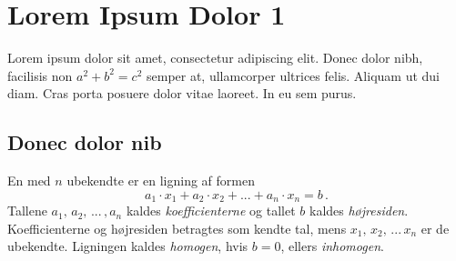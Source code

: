 
\setcounter{chapter}{998} %



\chapter{Lorem Ipsum Dolor 1} \label{tn999}


\begin{basis}
Lorem ipsum dolor sit amet, consectetur adipiscing elit. Donec dolor nibh, facilisis non $a^2 + b^2 = c^2$ semper at, ullamcorper ultrices felis. Aliquam ut dui diam.  Cras porta posuere dolor vitae laoreet. In eu sem purus. 
\end{basis}

\section{Donec dolor nib}
\label{tn999.linlign}

En  med $n$ ubekendte er en ligning af formen
\begin{equation}\label{TN999.1}
a_1\cdot x_1+a_2\cdot x_2+...+a_n\cdot x_n=b\,.
\end{equation}
Tallene $a_1,\,a_2,\,...\,,a_n$ kaldes \textit{koefficienterne} og tallet $b$ kaldes \textit{højresiden}. Koefficienterne og højresiden betragtes som kendte tal, mens $x_1,\,x_2,\,...\,x_n$ er de ubekendte. Ligningen kaldes \textit{homogen}, hvis $b=0$, ellers \textit{inhomogen}.


